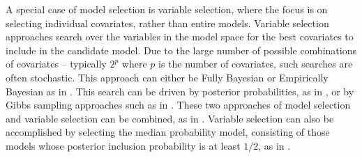 A special case of model selection is variable selection, where the focus is on selecting individual
covariates, rather than entire models. Variable selection approaches search over the
variables in the model space for the best covariates to include in the candidate model. Due to the large
number of possible combinations of covariates -- typically $2^p$ where $p$ is the number of covariates, such
searches are often stochastic. This approach can either be Fully Bayesian or Empirically Bayesian as in
\cite{Cui2008}.  This search can be driven by posterior probabilities, as in \cite{Casella2006}, or by Gibbs
sampling approaches such as in \cite{George1993}. These two approaches of model selection and variable
selection can be combined, as in \cite{Geweke1996}. Variable selection can also be accomplished by selecting
the median probability model, consisting of those models whose posterior inclusion probability is at least
$1/2$, as in \cite{Barbieri2004}.








